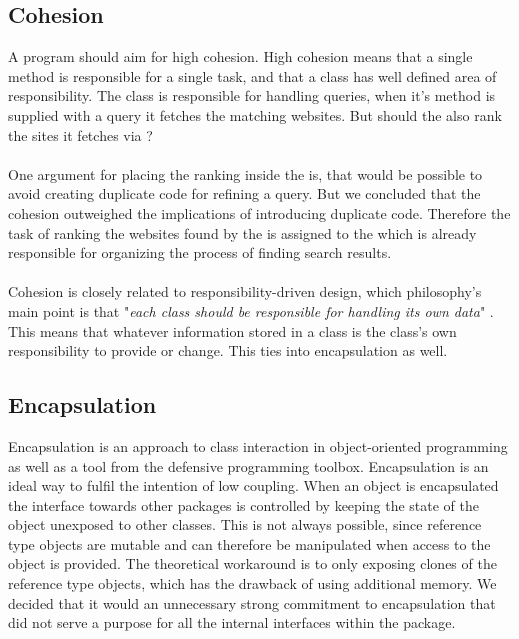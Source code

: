 \subsection{Cohesion}
A program should aim for high cohesion. %
High cohesion means that a single method is responsible for a single task, and that a class has well defined area of responsibility. 
The class  is responsible for handling queries, when it's method  is supplied with a query it fetches the matching websites. But should the  also rank the sites it fetches via ? 
\\ \\
One argument for placing the ranking inside the  is, that would be possible to avoid creating duplicate code for refining a query. But we concluded that the cohesion outweighed the implications of introducing duplicate code. Therefore the task of ranking the websites found by the  is assigned to the   which is already responsible for organizing the process of finding search results.
\\ \\
Cohesion is closely related to responsibility-driven design, which philosophy's main point is that "\textit{each class should be responsible for handling its own data}" \cite[270]{BK}. This means that whatever information stored in a class is the class's own responsibility to provide or change. This ties into encapsulation as well.

\subsection{Encapsulation}
Encapsulation is an approach to class interaction in object-oriented programming as well as a tool from the defensive programming toolbox. Encapsulation is an ideal way to fulfil the intention of low coupling. When an object is encapsulated the interface towards other packages is controlled by keeping the state of the object unexposed to other classes. This is not always possible, since reference type objects are mutable and can therefore be manipulated when access to the object is provided. The theoretical workaround is to only exposing clones of the reference type objects, which has the drawback of using additional memory. We decided that it would an unnecessary strong commitment to encapsulation that did not serve a purpose for all the internal interfaces within the  package.

